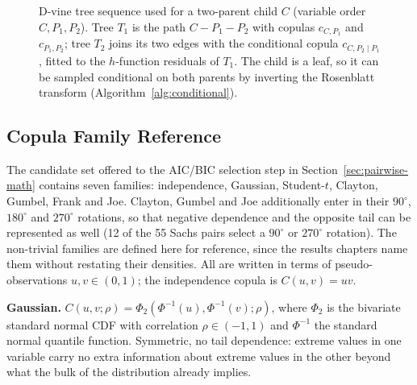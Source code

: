 \documentclass[
  english,
  class=report,
  accentcolor=2c,
  marginpar=false,
  parskip=half-,
  fontsize=11pt,
  ruledheaders=false,
  pdfa=false,
  IMRAD=false,
  thesis={type=master}
]{tudapub}
\begin{document}
\begin{figure}[ht]
\centering
{}
\caption{D-vine tree sequence used for a two-parent child $C$ (variable
order $C, P_1, P_2$). Tree $T_1$ is the path $C - P_1 - P_2$ with copulas
$c_{C,P_1}$ and $c_{P_1,P_2}$; tree $T_2$ joins its two edges with the
conditional copula $c_{C,P_2\mid P_1}$, fitted to the $h$-function
residuals of $T_1$. The child is a leaf, so it can be sampled conditional
on both parents by inverting the Rosenblatt transform
(Algorithm~\ref{alg:conditional}).}
\label{fig:vine-tree}
\end{figure}

\subsection{Copula Family Reference}
\label{sec:copula-glossary}
The candidate set offered to the AIC/BIC selection step in
Section~\ref{sec:pairwise-math} contains seven families: independence,
Gaussian, Student-$t$, Clayton, Gumbel, Frank and Joe. Clayton, Gumbel and
Joe additionally enter in their $90^\circ$, $180^\circ$ and $270^\circ$
rotations, so that negative dependence and the opposite tail can be
represented as well (12 of the 55 Sachs pairs select a $90^\circ$ or
$270^\circ$ rotation). The non-trivial families are defined here for
reference, since the results chapters name them without restating their
densities. All are written in terms of pseudo-observations $u,v \in
(0,1)$; the independence copula is $C(u,v) = uv$.

\textbf{Gaussian.} $C(u,v;\rho) = \Phi_2(\Phi^{-1}(u), \Phi^{-1}(v); \rho)$,
where $\Phi_2$ is the bivariate standard normal CDF with correlation $\rho
\in (-1,1)$ and $\Phi^{-1}$ the standard normal quantile function.
Symmetric, no tail dependence: extreme values in one variable carry no
extra information about extreme values in the other beyond what the bulk
of the distribution already implies.
\end{document}
